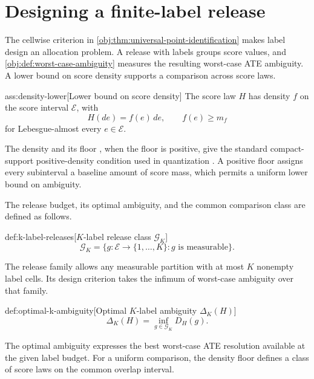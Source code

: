 \section{Designing a finite-label release}

The cellwise criterion in \cref{obj:thm:universal-point-identification} makes label design an allocation problem. A release with  labels groups score values, and \cref{obj:def:worst-case-ambiguity} measures the resulting worst-case ATE ambiguity. A lower bound on score density supports a comparison across score laws.

\begin{assumptionv}{ass:density-lower}[Lower bound on score density]
The score law \(H\) has density \(f\) on the score interval \(\mathcal E\), with
\[
H(de)=f(e)\,de,\qquad f(e)\ge m_f
\]
for Lebesgue-almost every \(e\in\mathcal E\).
\end{assumptionv}

The density  and its floor , when the floor is positive, give the standard compact-support positive-density condition used in quantization \citep{LemaireMontesPages2020}. A positive floor assigns every subinterval a baseline amount of score mass, which permits a uniform lower bound on ambiguity.

The release budget, its optimal ambiguity, and the common comparison class are defined as follows.

\begin{definitionv}{def:k-label-releases}[$K$-label release class $\mathcal G_K$]
\[
\mathcal G_K
=
\bigl\{g:\mathcal E\to\{1,\ldots,K\}:g\text{ is measurable}\bigr\}.
\]
\end{definitionv}

The release family  allows any measurable partition with at most \(K\) nonempty label cells. Its design criterion takes the infimum of worst-case ambiguity over that family.

\begin{definitionv}{def:optimal-k-ambiguity}[Optimal $K$-label ambiguity $\Delta_K(H)$]
\[
\Delta_K(H)=\inf_{g\in\mathcal G_K}D_H(g).
\]
\end{definitionv}

The optimal ambiguity  expresses the best worst-case ATE resolution available at the given label budget. For a uniform comparison, the density floor defines a class of score laws on the common overlap interval.

